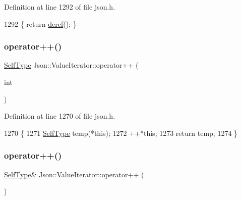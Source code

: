 Definition at line 1292 of file json.\+h.


\begin{DoxyCode}
1292 \{ \textcolor{keywordflow}{return} \hyperlink{class_json_1_1_value_iterator_base_aa5b75c9514a30ba2ea3c9a35c165c18e}{deref}(); \}
\end{DoxyCode}
\mbox{\label{class_json_1_1_value_iterator_abcf4ddd994a010742cd4a436d65acd08}} 
\subsubsection{\texorpdfstring{operator++()}{operator++()}\hspace{0.1cm}{\footnotesize\ttfamily [1/2]}}
{\footnotesize\ttfamily \hyperlink{class_json_1_1_value_iterator_base_a9d2a940d03ea06d20d972f41a89149ee}{Self\+Type} Json\+::\+Value\+Iterator\+::operator++ (\begin{DoxyParamCaption}\item[{int}]{ }\end{DoxyParamCaption})\hspace{0.3cm}{\ttfamily [inline]}}



Definition at line 1270 of file json.\+h.


\begin{DoxyCode}
1270                            \{
1271     \hyperlink{class_json_1_1_value_iterator_a23357670fdad61792670d86f62db7e16}{SelfType} temp(*\textcolor{keyword}{this});
1272     ++*\textcolor{keyword}{this};
1273     \textcolor{keywordflow}{return} temp;
1274   \}
\end{DoxyCode}
\mbox{\label{class_json_1_1_value_iterator_a92146c46f8249e2b2d12869e70cd4cee}} 
\subsubsection{\texorpdfstring{operator++()}{operator++()}\hspace{0.1cm}{\footnotesize\ttfamily [2/2]}}
{\footnotesize\ttfamily \hyperlink{class_json_1_1_value_iterator_base_a9d2a940d03ea06d20d972f41a89149ee}{Self\+Type}\& Json\+::\+Value\+Iterator\+::operator++ (\begin{DoxyParamCaption}{ }\end{DoxyParamCaption})\hspace{0.3cm}{\ttfamily [inline]}}



